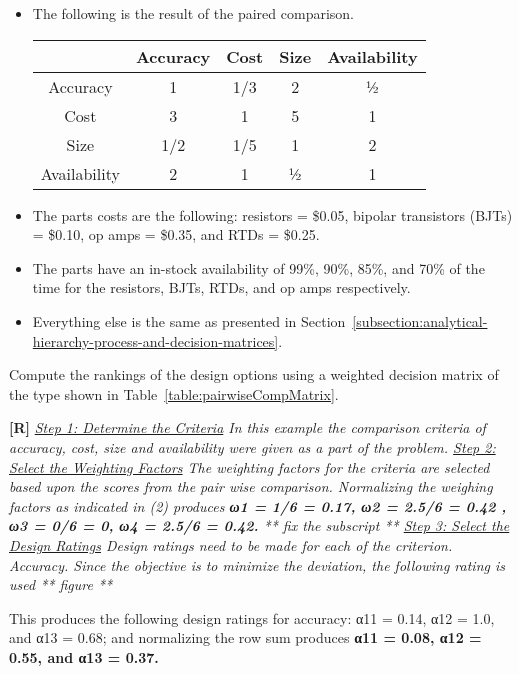 \begin{enumerate}
\begin{itemize}
\item
  The following is the result of the paired comparison.

\begin{table}
\begin{tabular}{|c|c|c|c|c|}
\hline
              &
Accuracy &
Cost &
Size &
Availability \\ \hline
Accuracy & 1 & 1/3 & 2 & ½ \\ \hline
Cost & 3 & 1 & 5 & 1 \\ \hline
Size & 1/2 & 1/5 & 1 & 2 \\ \hline
Availability & 2 & 1 & ½ & 1 \\ \hline
\end{tabular}
\end{table}


\item
  The parts costs are the following: resistors = \$0.05, bipolar
  transistors (BJTs) = \$0.10, op amps = \$0.35, and RTDs = \$0.25.
\item
  The parts have an in-stock availability of 99\%, 90\%, 85\%, and 70\%
  of the time for the re­sistors, BJTs, RTDs, and op amps respectively.
\item
  Everything else is the same as presented in 
  Section~\ref{subsection:analytical-hierarchy-process-and-decision-matrices}.
\end{itemize}

Compute the rankings of the design options using a weighted decision
matrix of the type shown in Table~\ref{table:pairwiseCompMatrix}.

  \begin{onlysolution}
  \textbf{[R]}
  \itshape
  \underline{Step 1: Determine the Criteria}
  In this example the comparison criteria of accuracy, cost, size and 
  availability were given as a part of the problem.
  \underline{Step 2: Select the Weighting Factors}
  The weighting factors for the criteria are selected based upon the 
  scores from the pair wise comparison. Normalizing the weighing factors 
  as indicated in (2) produces \textbf{ω1 = 1/6 = 0.17, ω2 = 2.5/6 = 0.42
  , ω3 = 0/6 = 0, ω4 = 2.5/6 = 0.42.} ** fix the subscript **
  \underline{Step 3: Select the Design Ratings}
  Design ratings need to be made for each of the criterion.
  \textit{Accuracy.} Since the objective is to minimize the deviation, 
  the following rating is used 
    ** figure ** 
  
  This produces the following design ratings for accuracy: α11 = 0.14, α12 = 1.0, 
  and α13 = 0.68; and normalizing the row sum produces \textbf{α11 = 0.08, α12 = 0.55, 
  and α13 = 0.37.}


\end{onlysolution}
\end{enumerate}
